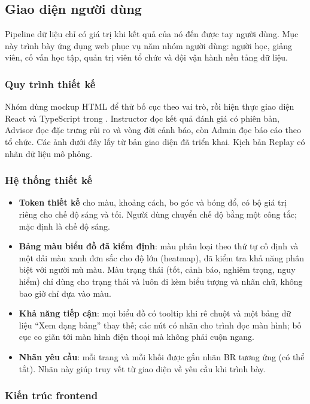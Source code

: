 \subsection{Giao diện người dùng}
\label{chap:ui}

Pipeline dữ liệu chỉ có giá trị khi kết quả của nó đến được tay người dùng. Mục này trình bày ứng dụng web phục vụ năm nhóm người dùng: người học, giảng viên, cố vấn học tập, quản trị viên tổ chức và đội vận hành nền tảng dữ liệu.

\subsubsection{Quy trình thiết kế}

Nhóm dùng mockup HTML để thử bố cục theo vai trò, rồi hiện thực giao diện React và TypeScript trong . Instructor đọc kết quả đánh giá có phiên bản, Advisor đọc đặc trưng rủi ro và vòng đời cảnh báo, còn Admin đọc báo cáo theo tổ chức. Các ảnh dưới đây lấy từ bản giao diện đã triển khai. Kịch bản Replay có nhãn dữ liệu mô phỏng.

\subsubsection{Hệ thống thiết kế}

\begin{itemize}
  \item \textbf{Token thiết kế} cho màu, khoảng cách, bo góc và bóng đổ, có bộ giá trị riêng cho chế độ sáng và tối. Người dùng chuyển chế độ bằng một công tắc; mặc định là chế độ sáng.
  \item \textbf{Bảng màu biểu đồ đã kiểm định}: màu phân loại theo thứ tự cố định và một dải màu xanh đơn sắc cho độ lớn (heatmap), đã kiểm tra khả năng phân biệt với người mù màu. Màu trạng thái (tốt, cảnh báo, nghiêm trọng, nguy hiểm) chỉ dùng cho trạng thái và luôn đi kèm biểu tượng và nhãn chữ, không bao giờ chỉ dựa vào màu.
  \item \textbf{Khả năng tiếp cận}: mọi biểu đồ có tooltip khi rê chuột và một bảng dữ liệu ``Xem dạng bảng'' thay thế; các nút có nhãn cho trình đọc màn hình; bố cục co giãn tới màn hình điện thoại mà không phải cuộn ngang.
  \item \textbf{Nhãn yêu cầu}: mỗi trang và mỗi khối được gắn nhãn BR tương ứng (có thể tắt). Nhãn này giúp truy vết từ giao diện về yêu cầu khi trình bày.
\end{itemize}

\subsubsection{Kiến trúc frontend}

